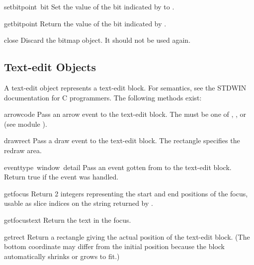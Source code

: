 \begin{funcdesc}{setbit}{point\, bit}
Set the value of the bit indicated by  to .
\end{funcdesc}

\begin{funcdesc}{getbit}{point}
Return the value of the bit indicated by .
\end{funcdesc}

\begin{funcdesc}{close}{}
Discard the bitmap object.  It should not be used again.
\end{funcdesc}

\subsection{Text-edit Objects}

A text-edit object represents a text-edit block.
For semantics, see the STDWIN documentation for C programmers.
The following methods exist:


\begin{funcdesc}{arrow}{code}
Pass an arrow event to the text-edit block.
The
must be one of
,
,
or
(see module
).
\end{funcdesc}

\begin{funcdesc}{draw}{rect}
Pass a draw event to the text-edit block.
The rectangle specifies the redraw area.
\end{funcdesc}

\begin{funcdesc}{event}{type\, window\, detail}
Pass an event gotten from
to the text-edit block.
Return true if the event was handled.
\end{funcdesc}

\begin{funcdesc}{getfocus}{}
Return 2 integers representing the start and end positions of the
focus, usable as slice indices on the string returned by
.
\end{funcdesc}

\begin{funcdesc}{getfocustext}{}
Return the text in the focus.
\end{funcdesc}

\begin{funcdesc}{getrect}{}
Return a rectangle giving the actual position of the text-edit block.
(The bottom coordinate may differ from the initial position because
the block automatically shrinks or grows to fit.)
\end{funcdesc}

